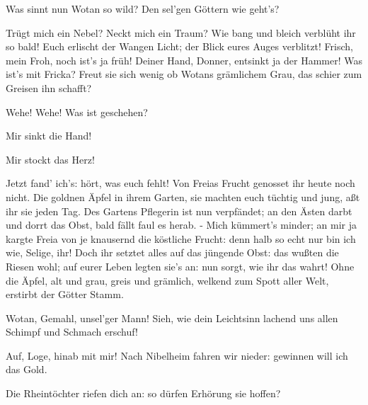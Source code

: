 \begin{drama}

Was sinnt nun Wotan so wild?
Den sel'gen Göttern wie geht's?
 




\Logespeaks
Trügt mich ein Nebel?
Neckt mich ein Traum?
Wie bang und bleich verblüht ihr so bald!
Euch erlischt der Wangen Licht;
der Blick eures Auges verblitzt!
Frisch, mein Froh, noch ist's ja früh!
Deiner Hand, Donner, entsinkt ja der Hammer!
Was ist's mit Fricka? Freut sie sich wenig
ob Wotans grämlichem Grau,
das schier zum Greisen ihn schafft?
 

\Frickaspeaks
Wehe! Wehe! Was ist geschehen?
 

\Donnerspeaks
Mir sinkt die Hand!
 

\Frohspeaks
Mir stockt das Herz!
 

\Logespeaks
Jetzt fand' ich's: hört, was euch fehlt!
Von Freias Frucht genosset ihr heute noch nicht.
Die goldnen Äpfel in ihrem Garten,
sie machten euch tüchtig und jung,
aßt ihr sie jeden Tag.
Des Gartens Pflegerin ist nun verpfändet;
an den Ästen darbt und dorrt das Obst,
bald fällt faul es herab. -
Mich kümmert's minder;
an mir ja kargte Freia von je
knausernd die köstliche Frucht:
denn halb so echt nur bin ich wie, Selige, ihr!
Doch ihr setztet alles auf das jüngende Obst:
das wußten die Riesen wohl;
auf eurer Leben legten sie's an:
nun sorgt, wie ihr das wahrt!
Ohne die Äpfel,
alt und grau, greis und grämlich,
welkend zum Spott aller Welt,
erstirbt der Götter Stamm.
 

\Frickaspeaks


Wotan, Gemahl, unsel'ger Mann!
Sieh, wie dein Leichtsinn lachend uns allen
Schimpf und Schmach erschuf!
 

\Wotanspeaks


Auf, Loge, hinab mit mir!
Nach Nibelheim fahren wir nieder:
gewinnen will ich das Gold.
 

\Logespeaks
Die Rheintöchter riefen dich an:
so dürfen Erhörung sie hoffen?
 

\Wotanspeaks



\end{drama}
